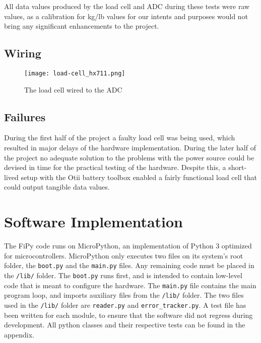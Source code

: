 All data values produced by the load cell and ADC during these tests were raw values, as a calibration for kg/lb values for our intents and purposes would not bring any significant enhancements to the project.

\subsection{Wiring}
\begin{figure}[h]
	\centering
	\texttt{[image: load-cell\_hx711.png]}
	\caption{The load cell wired to the ADC}
	\label{fig:load-cell_hx711}
\end{figure}

\subsection{Failures}
During the first half of the project a faulty load cell was being used, which resulted in major delays of the hardware implementation. During the later half of the project no adequate solution to the problems with the power source could be devised in time for the practical testing of the hardware. Despite this, a short-lived setup with the Otii battery toolbox enabled a fairly functional load cell that could output tangible data values.



\section{Software Implementation}
The FiPy code runs on MicroPython, an implementation of Python 3 optimized for microcontrollers. MicroPython only executes two files on its system's root folder, the \lstinline{boot.py} and the \lstinline{main.py} files. Any remaining code must be placed in the \lstinline{/lib/} folder. The \lstinline{boot.py} runs first, and is intended to contain low-level code that is meant to configure the hardware. The \lstinline{main.py} file contains the main program loop, and imports auxiliary files from the \lstinline{/lib/} folder.
The two files used in the \lstinline{/lib/} folder are \lstinline{reader.py} and \lstinline{error_tracker.py}. A test file has been written for each module, to ensure that the software did not regress during development. All python classes and their respective tests can be found in the appendix. 

